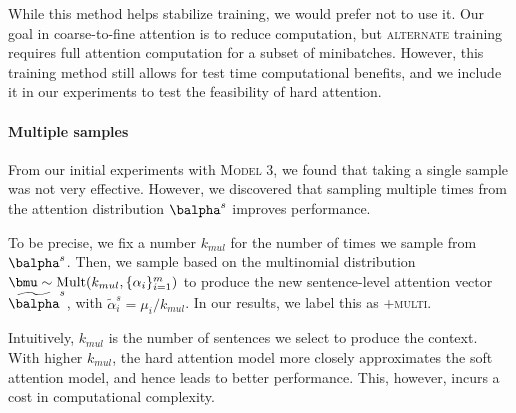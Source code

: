 \documentclass[12pt]{report}
\begin{document}
While this method helps stabilize training, we would prefer not to use it. Our goal in coarse-to-fine attention is to reduce computation, but \textsc{alternate} training requires full attention computation for a subset of minibatches. However, this training method still allows for test time computational benefits, and we include it in our experiments to test the feasibility of hard attention.


\paragraph{Multiple samples} 
From our initial experiments with \textsc{Model 3}, we found that taking a single sample was not very effective. However, we discovered that sampling multiple times from the attention distribution $\balpha^s$ improves performance.

To be precise, we fix a number $k_{mul}$ for the number of times we sample from $\balpha^s$. Then, we sample based on the multinomial distribution $\bmu \sim \mathrm{Mult}(k_{mul}, \{\alpha_i\}_{i=1}^m)$ to produce the new sentence-level attention vector $\widetilde{\balpha}^s$, with $\widetilde{\alpha}_i^s = \mu_i / k_{mul}$. In our results, we label this as \textsc{+multi}.

Intuitively, $k_{mul}$ is the number of sentences we select to produce the context. With higher $k_{mul}$, the hard attention model more closely approximates the soft attention model, and hence leads to better performance. This, however, incurs a cost in computational complexity.

%
%
%



\end{document}
